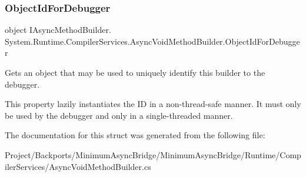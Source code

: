 \subsubsection{\texorpdfstring{Object\+Id\+For\+Debugger}{ObjectIdForDebugger}}
{\footnotesize\ttfamily object I\+Async\+Method\+Builder. System.\+Runtime.\+Compiler\+Services.\+Async\+Void\+Method\+Builder.\+Object\+Id\+For\+Debugger\hspace{0.3cm}{\ttfamily [get]}}



Gets an object that may be used to uniquely identify this builder to the debugger. 

This property lazily instantiates the ID in a non-\/thread-\/safe manner. It must only be used by the debugger and only in a single-\/threaded manner. 

The documentation for this struct was generated from the following file\+:\begin{DoxyCompactItemize}
\item 
Project/\+Backports/\+Minimum\+Async\+Bridge/\+Minimum\+Async\+Bridge/\+Runtime/\+Compiler\+Services/Async\+Void\+Method\+Builder.\+cs\end{DoxyCompactItemize}
